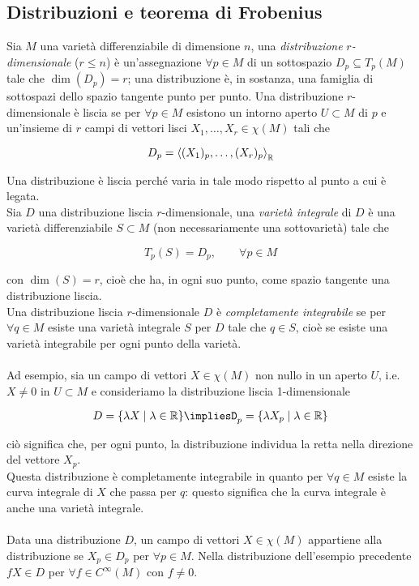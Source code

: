 \subsection{Distribuzioni e teorema di Frobenius}

Sia $ M $ una varietà differenziabile di dimensione $ n $, una \textit{distribuzione} $ r $\textit{-dimensionale} ($ r \leqslant n $) è un'assegnazione $ \forall p \in M $ di un sottospazio $ D_{p} \subseteq T_{p}(M) $ tale che $ \dim(D_{p}) = r $; una distribuzione è, in sostanza, una famiglia di sottospazi dello spazio tangente punto per punto. Una distribuzione $ r $-dimensionale è liscia se per $ \forall p \in M $ esistono un intorno aperto $ U \subset M $ di $ p $ e un'insieme di $ r $ campi di vettori lisci $ X_{1},\dots,X_{r} \in \chi(M) $ tali che

\begin{equation}
	D_{p} = \left\langle (X_{1})_{p}, \dots, (X_{r})_{p} \right\rangle_{\mathbb{R}}
\end{equation}

Una distribuzione è liscia perché varia in tale modo rispetto al punto a cui è legata.\\
Sia $ D $ una distribuzione liscia $ r $-dimensionale, una \textit{varietà integrale} di $ D $ è una varietà differenziabile $ S \subset M $ (non necessariamente una sottovarietà) tale che

\begin{equation}
	T_{p}(S) = D_{p}, \qquad \forall p \in M
\end{equation}

con $ \dim(S) = r $, cioè che ha, in ogni suo punto, come spazio tangente una distribuzione liscia.\\
Una distribuzione liscia $ r $-dimensionale $ D $ è \textit{completamente integrabile} se per $ \forall q \in M $ esiste una varietà integrale $ S $ per $ D $ tale che $ q \in S $, cioè se esiste una varietà integrabile per ogni punto della varietà.\\\\
%
Ad esempio, sia un campo di vettori $ X \in \chi(M) $ non nullo in un aperto $ U $, i.e. $ X \neq 0 $ in $ U \subset M $ e consideriamo la distribuzione liscia 1-dimensionale

\begin{equation}
	D = \{ \lambda X \mid \lambda \in \R \} %
	\implies%
	D_{p} = \{ \lambda X_{p} \mid \lambda \in \R \}
\end{equation}

ciò significa che, per ogni punto, la distribuzione individua la retta nella direzione del vettore $ X_{p} $.\\
Questa distribuzione è completamente integrabile in quanto per $ \forall q \in M $ esiste la curva integrale di $ X $ che passa per $ q $: questo significa che la curva integrale è anche una varietà integrale.\\\\
%
Data una distribuzione $ D $, un campo di vettori $ X \in \chi(M) $ appartiene alla distribuzione se $ X_{p} \in D_{p} $ per $ \forall p \in M $. Nella distribuzione dell'esempio precedente $ f X \in D $ per $ \forall f \in C^{\infty}(M) $ con $ f \neq 0 $.

